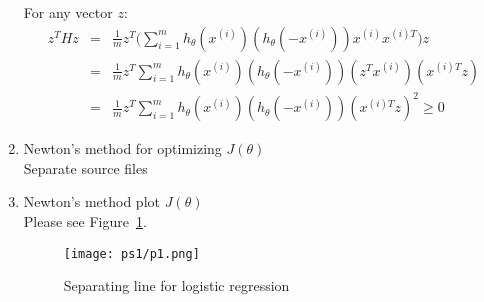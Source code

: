 \documentclass[11pt]{article}
\begin{document}
\begin{enumerate}
  For any vector $z$:
  \begin{eqnarray*}
    z^THz
    &=&\frac{1}{m}z^T \bigg(\sum\limits_{i=1}^m h_\theta(x^{(i)})(h_\theta(-x^{(i)})) x^{(i)}x^{(i)T} \bigg)z \\
    &=&\frac{1}{m}z^T \sum\limits_{i=1}^m h_\theta(x^{(i)})(h_\theta(-x^{(i)})) (z^T x^{(i)})(x^{(i)T} z) \\
    &=&\frac{1}{m}z^T \sum\limits_{i=1}^m h_\theta(x^{(i)})(h_\theta(-x^{(i)})) (x^{(i)T} z)^2 \geq 0
  \end{eqnarray*}

\item Newton's method for optimizing $J(\theta)$\\
  Separate source files 
\item Newton's method plot $J(\theta)$\\
  Please see Figure~\ref{fig1}.
\begin{figure}[htbp]
  \begin{center}
    \texttt{[image: ps1/p1.png]}
    \caption{Separating line for logistic regression}\label{fig1}
  \end{center}
\end{figure}
\end{enumerate}
\end{document}
